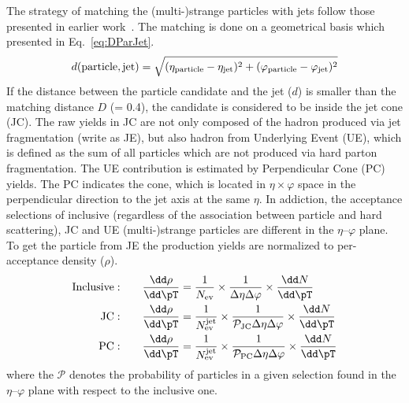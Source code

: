\documentclass[ALICE,manyauthors]{cernphprep}
\begin{document}
The strategy of matching the (multi-)strange particles with jets follow those presented in earlier work~\cite{Acharya:2021oaa}.
The matching is done on a geometrical basis which presented in Eq.~\ref{eq:DParJet}.
\begin{equation}
d(\mathrm{particle, jet}) = \sqrt{(\eta_\mathrm{particle} -\eta_{\rm jet})^{2} + (\varphi_\mathrm{particle} -\varphi_{\rm jet})^{2}}
\label{eq:DParJet}
\end{equation}
If the distance between the particle candidate and the jet ($d$) is smaller than the matching distance $D$ (= 0.4), the candidate is considered to be inside the jet cone (JC).
The raw yields in JC are not only composed of the hadron produced via jet fragmentation (write as JE), but also hadron from Underlying Event (UE), which is defined as the sum of all particles which are not produced via hard parton fragmentation.
The UE contribution is estimated by Perpendicular Cone (PC) yields.
The PC indicates the cone, which is located in $\eta \times \varphi$ space in the perpendicular direction to the jet axis at the same $\eta$.
In addiction, the acceptance selections of inclusive (regardless of the association between particle and hard scattering), JC and UE (multi-)strange particles are different in the $\eta$--$\varphi$ plane.
To get the particle from JE the production yields are normalized to per-acceptance density ($\rho$).
\begin{equation}
\begin{split}
{\rm Inclusive:}\qquad & \frac{\dd\rho}{\dd\pT} = \frac{1}{N_{\rm ev}}\times\frac{1}{\Delta\eta\Delta\varphi}\times\frac{\dd N}{\dd\pT} \\
{\rm JC:}\qquad & \frac{\dd\rho}{\dd\pT} = \frac{1}{N_{\rm ev}^{\rm jet}} \times\frac{1}{\mathcal{P}_{\rm JC}\Delta\eta\Delta\varphi}\times\frac{\dd N}{\dd\pT} \\
{\rm PC:}\qquad & \frac{\dd\rho}{\dd\pT} = \frac{1}{N_{\rm ev}^{\rm jet}} \times\frac{1}{\mathcal{P}_{\rm PC}\Delta\eta\Delta\varphi}\times\frac{\dd N}{\dd\pT} \\
\end{split}
\label{eq:normalize}
\end{equation}
where the $\mathcal{P}$ denotes the probability of particles in a given selection found in the $\eta$--$\varphi$ plane with respect to the inclusive one.
\end{document}
